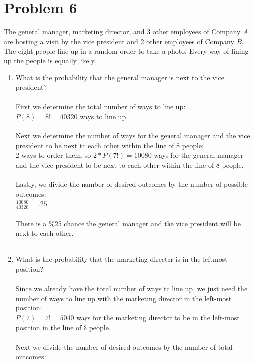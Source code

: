 \documentclass{amsart}
\theoremstyle{definition}
\theoremstyle{Exercise}
\theoremstyle{remark}
\theoremstyle{rule}
\numberwithin{equation}{section}
\begin{document}
  \section*{Problem 6}
The general manager, marketing director, and 3 other employees of Company $A$ are hosting a visit by the vice president and 2 other employees of Company $B$. The eight people line up in a random order to take a photo. Every way of lining up the people is equally likely.
\begin{enumerate}[label=(\alph*)]
  \item What is the probability that the general manager is next to the vice president?
\\\\
  First we determine the total number of ways to line up:\\ 
  $P(8) = 8! = 40320$ ways to line up.\\\\
  Next we determine the number of ways for the general manager and the vice president to be next to each other within the line of 8 people:\\
  $2$ ways to order them, so $2 * P(7!) = 10080$ ways for the general manager and the vice president to be next to each other within the line of 8 people.\\\\
  Lastly, we divide the number of desired outcomes by the number of possible outcomes:\\
  $\frac{10080}{40320} = .25$.\\\\
  There is a \%25 chance the general manager and the vice president will be next to each other.
\\\\
  \item What is the probability that the marketing director is in the leftmost position?
\\\\
  Since we already have the total number of ways to line up, we just need the number of ways to line up with the marketing director in the left-most position:\\
  $P(7) = 7! = 5040$ ways for the marketing director to be in the left-most position in the line of 8 people.\\\\
  Next we divide the number of desired outcomes by the number of total outcomes:\\

\end{enumerate}
\end{document}

